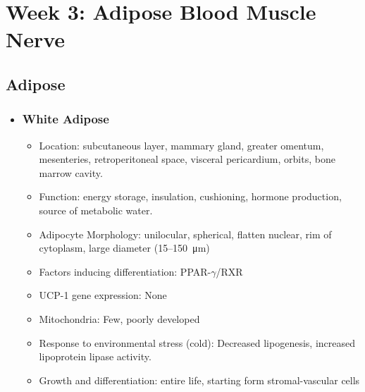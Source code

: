 \chapter{Week 3: Adipose Blood Muscle Nerve}

\section{Adipose}
\begin{itemize}
  \item []
  
  \subsection{White Adipose}
  \begin{center}
  \end{center}
  \bigskip
  \begin{itemize}
    \item Location: subcutaneous layer, mammary gland, greater omentum, mesenteries, retroperitoneal space, visceral pericardium, orbits, bone marrow cavity.
    \item Function: energy storage, insulation, cushioning, hormone production, source of metabolic water.
    \item Adipocyte Morphology: unilocular, spherical, flatten nuclear, rim of cytoplasm, large diameter (15--\SI{150}{\micro\meter})
    \item Factors inducing differentiation: PPAR-\(\gamma \)/RXR
    \item UCP-1 gene expression: None
    \item Mitochondria: Few, poorly developed
    \item Response to environmental stress (cold): Decreased lipogenesis, increased lipoprotein lipase activity.
    \item Growth and differentiation: entire life, starting form stromal-vascular cells
  \end{itemize}
  

\end{itemize}
